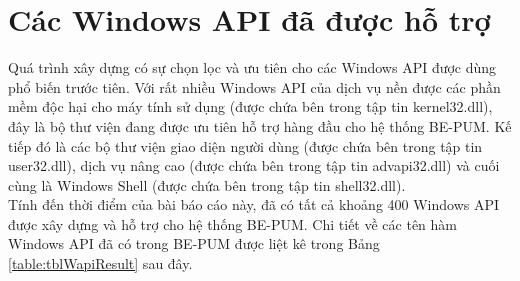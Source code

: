 \section{Các Windows API đã được hỗ trợ}

Quá trình xây dựng có sự chọn lọc và ưu tiên cho các Windows API được dùng phổ biến trước tiên. Với rất nhiều Windows API của dịch vụ nền được các phần mềm độc hại cho máy tính sử dụng (được chứa bên trong tập tin kernel32.dll), đây là bộ thư viện đang được ưu tiên hỗ trợ hàng đầu cho hệ thống BE-PUM. Kế tiếp đó là các bộ thư viện giao diện người dùng (được chứa bên trong tập tin user32.dll), dịch vụ nâng cao (được chứa bên trong tập tin advapi32.dll) và cuối cùng là Windows Shell (được chứa bên trong tập tin shell32.dll).\\

Tính đến thời điểm của bài báo cáo này, đã có tất cả khoảng 400 Windows API được xây dựng và hỗ trợ cho hệ thống BE-PUM. Chi tiết về các tên hàm Windows API đã có trong BE-PUM được liệt kê trong Bảng \ref{table:tblWapiResult} sau đây.


